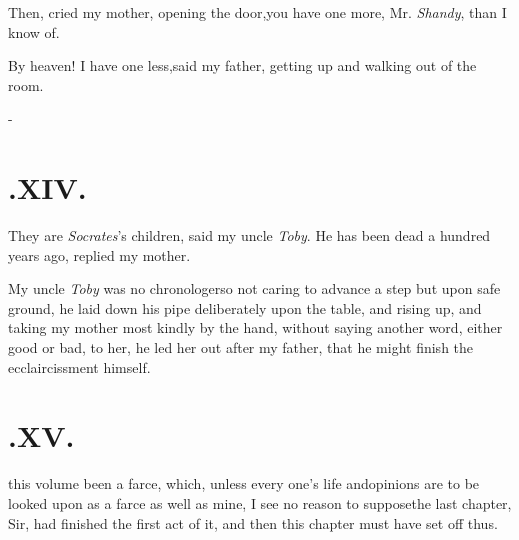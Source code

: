 \documentclass{article}
\begin{document}
\vskip -2pt

\tsh  Then, cried my mother, opening the
door,\tsh you have one more, Mr. \textit{Shandy}, than I
know of.

\vskip -2pt

By heaven! I have one less,\tsk said my father, getting up and
walking out of the room.

\setlength{\baselineskip}{12.78pt}  %
\null\kern-\baselineskip
\section{.\enspace  XIV.}

\quad\tsh They are \textit{Socrates}’s children, said my uncle
\textit{Toby}. He has been dead a hundred years ago, replied my
mother.

My uncle \textit{Toby} was no chronologer\tsk so not caring to
advance a step but upon safe ground, he laid down his pipe
deliberately upon the table, and rising up, and taking my mother
most kindly by the hand, without saying another word, either good
or bad, to her, he led her out after my father, that he might
finish the ecclaircissment himself.

\section{.\enspace  XV.}

 this volume been a farce,\break
which, unless every one’s life and\break opinions are to be looked upon as
a farce as well as mine, I see no reason to suppose\tsk the last
chapter, Sir, had finished
the first act of it, and then this
chapter must have set off thus.
\end{document}
